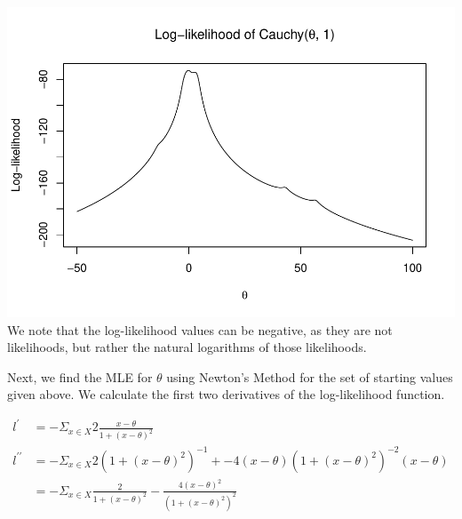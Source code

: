 \documentclass[]{article}
\begin{document}
\includegraphics{Atlas-PS_2_files/figure-latex/unnamed-chunk-6-1.pdf} We
note that the log-likelihood values can be negative, as they are not
likelihoods, but rather the natural logarithms of those likelihoods.

Next, we find the MLE for \(\theta\) using Newton's Method for the set
of starting values given above. We calculate the first two derivatives
of the log-likelihood function.

\begin{align*}
l^{\prime} &= - \Sigma_{x \in X} 2 \frac{x - \theta}{1 + (x - \theta) ^2} \\
l^{\prime \prime} &= 
  - \Sigma_{x \in X} 2(1 + (x - \theta)^2)^{-1} + 
    -4 (x - \theta)(1 + (x - \theta)^2)^{-2}(x - \theta) \\
    &= - \Sigma_{x \in X} \frac{2}{1 + (x - \theta)^2} - 
    \frac{4(x - \theta)^2}{(1 + (x - \theta)^2)^2}
\end{align*}
\end{document}
